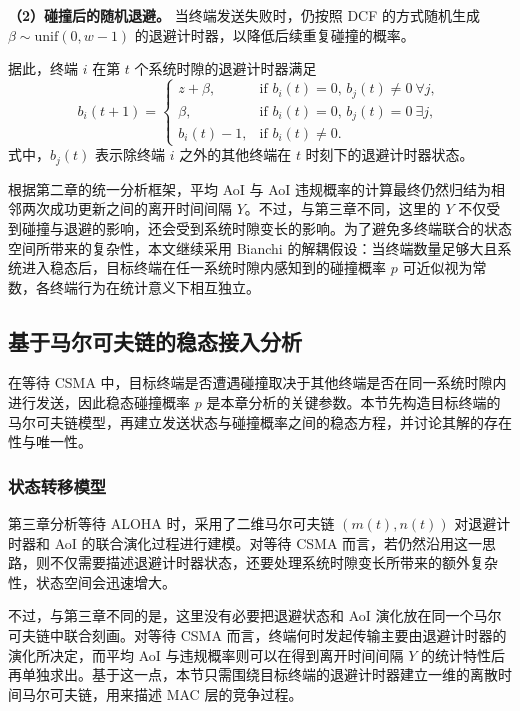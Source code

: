 \textbf{（2）碰撞后的随机退避。} 当终端发送失败时，仍按照 DCF 的方式随机生成 $\beta \sim \text{unif}(0,w-1)$ 的退避计时器，以降低后续重复碰撞的概率。

据此，终端 $i$ 在第 $t$ 个系统时隙的退避计时器满足
\begin{equation}\label{cp4_backoff_counter_evolution}
    b_i(t + 1) =
\begin{cases}
z + \beta, & \text{if } b_i(t) = 0, \, b_j(t) \neq 0 \ \forall j, \\
\beta, & \text{if } b_i(t) = 0, \, b_j(t) = 0 \ \exists j, \\
b_i(t) - 1, & \text{if } b_i(t) \neq 0.
\end{cases}
\end{equation}
式中，$b_j(t)$ 表示除终端 $i$ 之外的其他终端在 $t$ 时刻下的退避计时器状态。

根据第二章的统一分析框架，平均 AoI 与 AoI 违规概率的计算最终仍然归结为相邻两次成功更新之间的离开时间间隔 $Y$。不过，与第三章不同，这里的 $Y$ 不仅受到碰撞与退避的影响，还会受到系统时隙变长的影响。为了避免多终端联合的状态空间所带来的复杂性，本文继续采用 Bianchi 的解耦假设：当终端数量足够大且系统进入稳态后，目标终端在任一系统时隙内感知到的碰撞概率 $p$ 可近似视为常数，各终端行为在统计意义下相互独立。

\subsection{基于马尔可夫链的稳态接入分析}

在等待 CSMA 中，目标终端是否遭遇碰撞取决于其他终端是否在同一系统时隙内进行发送，因此稳态碰撞概率 $p$ 是本章分析的关键参数。本节先构造目标终端的马尔可夫链模型，再建立发送状态与碰撞概率之间的稳态方程，并讨论其解的存在性与唯一性。

\subsubsection{状态转移模型}

第三章分析等待 ALOHA 时，采用了二维马尔可夫链 $(m(t),n(t))$ 对退避计时器和 AoI 的联合演化过程进行建模。对等待 CSMA 而言，若仍然沿用这一思路，则不仅需要描述退避计时器状态，还要处理系统时隙变长所带来的额外复杂性，状态空间会迅速增大。

不过，与第三章不同的是，这里没有必要把退避状态和 AoI 演化放在同一个马尔可夫链中联合刻画。对等待 CSMA 而言，终端何时发起传输主要由退避计时器的演化所决定，而平均 AoI 与违规概率则可以在得到离开时间间隔 $Y$ 的统计特性后再单独求出。基于这一点，本节只需围绕目标终端的退避计时器建立一维的离散时间马尔可夫链，用来描述 MAC 层的竞争过程。

